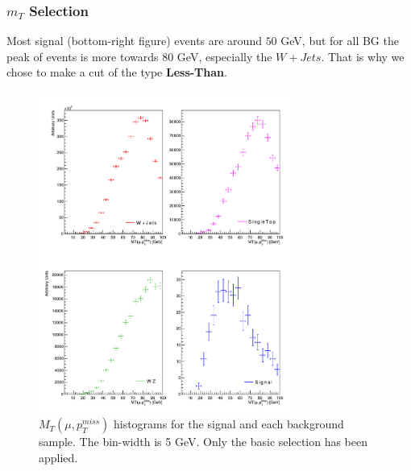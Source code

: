 \documentclass{beamer}
\begin{document}
\begin{frame}
\frametitle{$m_T$ Selection}

	\begin{justify}
		{\tiny Most signal (bottom-right figure) events are around $50$ GeV, but for all BG the peak of events is more towards $80$ GeV, especially the $W+Jets$. That is why we chose to make a cut of the type \textbf{Less-Than}.}
	\end{justify}

	\begin{figure}[!h]
		\centering
		\includegraphics[width=0.75\textwidth, height=0.63\textheight]{pictures/Selection/m_T/All-m_T}
		\caption{{\scriptsize $M_T(\mu,p^{miss}_T)$ histograms for the signal and each background sample. The bin-width is 5 GeV. Only the basic selection has been applied.}}
		\label{All-m_T}
	
	\end{figure}

\end{frame}

\end{document}
